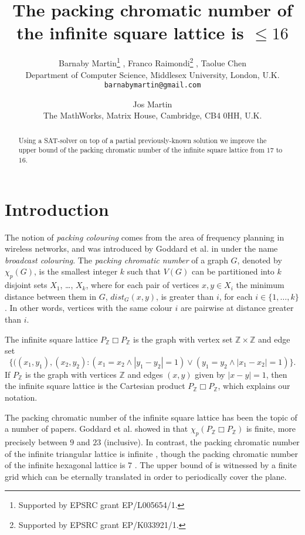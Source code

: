 \documentclass[a4paper,12pt]{article}
\title{The packing chromatic number of the infinite square lattice is $\leq 16$}
\author{
Barnaby Martin\thanks{Supported by EPSRC grant EP/L005654/1.} , Franco Raimondi\thanks{Supported by EPSRC grant EP/K033921/1.} , Taolue Chen \\ 
Department of Computer Science, Middlesex University, London, U.K. \\
\texttt{barnabymartin@gmail.com}
\and
Jos Martin \\
The MathWorks, Matrix House, Cambridge, CB4 0HH, U.K.}
\theoremstyle{remark}
\begin{document}
\maketitle

\begin{abstract}
Using a SAT-solver on top of a partial previously-known solution we improve the upper bound of the packing chromatic number of the infinite square lattice from $17$ to $16$.
\end{abstract}

\section{Introduction}

The notion of \emph{packing colouring} comes from the area of frequency planning in wireless networks, and was introduced by Goddard et \mbox{al.} in \cite{BroadcastChromaticNumber} under the name \emph{broadcast colouring}. The \emph{packing chromatic number} of a graph $G$, denoted by $\chi_p(G)$, is the smallest integer $k$ such that $V(G)$ can be partitioned into $k$ disjoint sets $X_1$, \ldots, $X_k$, where for each pair of vertices $x,y \in X_i$ the minimum distance between them in $G$, $\mathit{dist}_G(x, y)$, is greater than $i$, for each $i\in \{1,\ldots,k\}$. In other words,
vertices with the same colour $i$ are pairwise at distance greater than $i$.

The infinite square lattice $P_\mathbb{Z} \Box P_\mathbb{Z}$ is the graph with vertex set $\mathbb{Z} \times \mathbb{Z}$ and edge set 
\[ \{((x_1,y_1),(x_2,y_2) : (x_1=x_2 \wedge |y_1-y_2|=1) \vee  (y_1=y_2 \wedge |x_1-x_2|=1)\}.\]
If $P_\mathbb{Z}$ is the graph with vertices $\mathbb{Z}$ and edges $(x,y)$ given by $|x-y|=1$, then the infinite square lattice is the Cartesian product  $P_\mathbb{Z} \Box P_\mathbb{Z}$, which explains our notation.

The packing chromatic number of the infinite square lattice has been the topic of a number of papers. Goddard et \mbox{al.} showed in \cite{BroadcastChromaticNumber} that $\chi_p(P_\mathbb{Z} \Box P_\mathbb{Z})$ is finite, more precisely between $9$ and $23$ (inclusive). In contrast, the packing chromatic number of the infinite triangular lattice is infinite \cite{FinbowRall07}, though the packing chromatic number of the infinite hexagonal lattice is $7$ \cite{HexagonalLattice7}. The upper bound of \cite{BroadcastChromaticNumber} is witnessed by a finite grid which can be eternally translated in order to periodically cover the plane.
\end{document}
